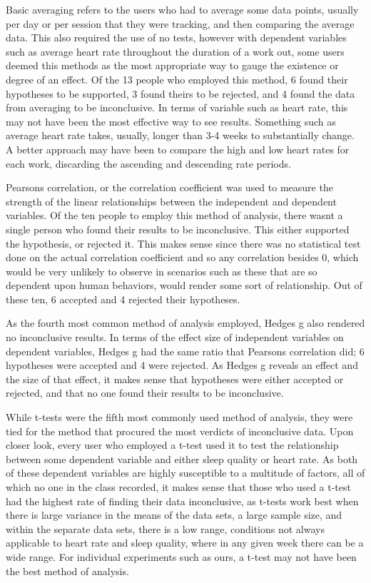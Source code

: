 Basic averaging refers to the users who had to average some data points, usually per day or per session that they were tracking, and then comparing the average data.  This also required the use of no tests, however with dependent variables such as average heart rate throughout the duration of a work out, some users deemed this methods as the most appropriate way to gauge the existence or degree of an effect.  Of the 13 people who employed this method, 6 found their hypotheses to be supported, 3 found theirs to be rejected, and 4 found the data from averaging to be inconclusive.  In terms of variable such as heart rate, this may not have been the most effective way to see results.  Something such as average heart rate takes, usually, longer than 3-4 weeks to substantially change.  A better approach may have been to compare the high and low heart rates for each work, discarding the ascending and descending rate periods.  

Pearson\textquotesingle s correlation, or the correlation coefficient was used to measure the strength of the linear relationships between the independent and dependent variables.  Of the ten people to employ this method of analysis, there wasn\textquotesingle t a single person who found their results to be inconclusive.  This either supported the hypothesis, or rejected it.  This makes sense since there was no statistical test done on the actual correlation coefficient and so any correlation besides 0, which would be very unlikely to observe in scenarios such as these that are so dependent upon human behaviors, would render some sort of relationship. Out of these ten, 6 accepted and 4 rejected their hypotheses. 

As the fourth most common method of analysis employed, Hedge\textquotesingle s g also rendered no inconclusive results.  In terms of the effect size of independent variables on dependent variables, Hedge\textquotesingle s g had the same ratio that Pearson\textquotesingle s correlation did; 6 hypotheses were accepted and 4 were rejected.  As Hedge\textquotesingle s g reveals an effect and the size of that effect, it makes sense that hypotheses were either accepted or rejected, and that no one found their results to be inconclusive. 

While t-tests were the fifth most commonly used method of analysis, they were tied for the method that procured the most verdicts of inconclusive data.  Upon closer look, every user who employed a t-test used it to test the relationship between some dependent variable and either sleep quality or heart rate.  As both of these dependent variables are highly susceptible to a multitude of factors, all of which no one in the class recorded, it makes sense that those who used a t-test had the highest rate of finding their data inconclusive, as t-tests work best when there is large variance in the means of the data sets, a large sample size, and within the separate data sets, there is a low range, conditions not always applicable to heart rate and sleep quality, where in any given week there can be a wide range.  For individual experiments such as ours, a t-test may not have been the best method of analysis.

